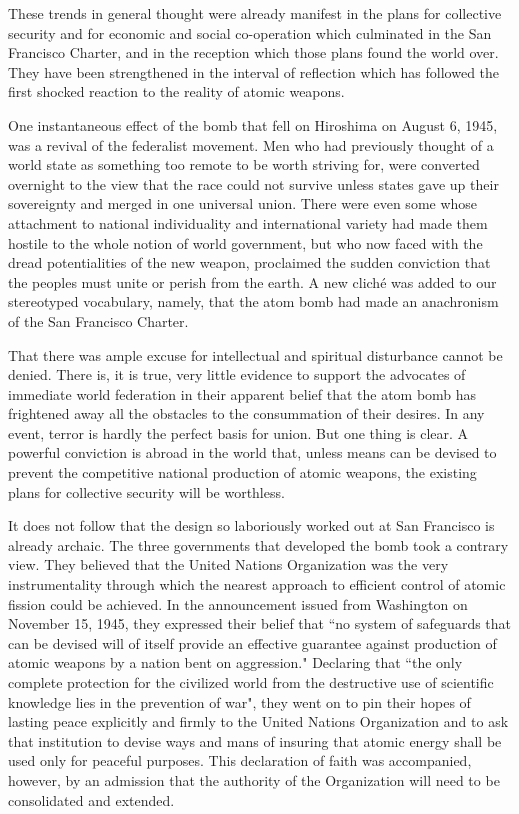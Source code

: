 These trends in general thought were already manifest in the plans for collective security and for economic and social co-operation which culminated in the San Francisco Charter, and in the reception which those plans found the world over. They have been strengthened in the interval of reflection which has followed the first shocked reaction to the reality of atomic weapons.

One instantaneous effect of the bomb that fell on Hiroshima on August 6, 1945, was a revival of the federalist movement. Men who had previously thought of a world state as something too remote to be worth striving for, were converted overnight to the view that the race could not survive unless states gave up their sovereignty and merged in one universal union. There were even some whose attachment to national individuality and international variety had made them hostile to the whole notion of world government, but who now faced with the dread potentialities of the new weapon, proclaimed the sudden conviction that the peoples must unite or perish from the earth. A new clich\'e was added to our stereotyped vocabulary, namely, that the atom bomb had made an anachronism of the San Francisco Charter.

That there was ample excuse for intellectual and spiritual disturbance cannot be denied. There is, it is true, very little evidence to support the advocates of immediate world federation in their apparent belief that the atom bomb has frightened away all the obstacles to the consummation of their desires. In any event, terror is hardly the perfect basis for union. But one thing is clear. A powerful conviction is abroad in the world that, unless means can be devised to prevent the competitive national production of atomic weapons, the existing plans for collective security will be worthless.

It does not follow that the design so laboriously worked out at San Francisco is already archaic. The three governments that developed the bomb took a contrary view. They believed that the United Nations Organization was the very instrumentality through which the nearest approach to efficient control of atomic fission could be achieved. In the announcement issued from Washington on November 15, 1945, they expressed their belief that ``no system of safeguards that can be devised will of itself provide an effective guarantee against production of atomic weapons by a nation bent on aggression." Declaring that ``the only complete protection for the civilized world from the destructive use of scientific knowledge lies in the prevention of war", they went on to pin their hopes of lasting peace explicitly and firmly to the United Nations Organization and to ask that institution to devise ways and mans of insuring that atomic energy shall be used only for peaceful purposes. This declaration of faith was accompanied, however, by an admission that the authority of the Organization will need to be consolidated and extended.

